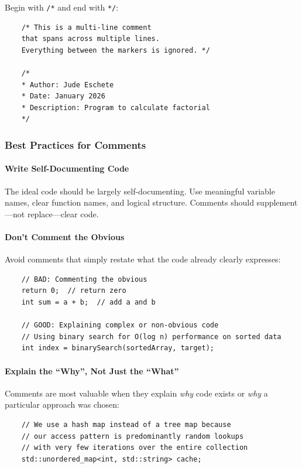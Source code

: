 Begin with \texttt{/*} and end with \texttt{*/}:

\begin{lstlisting}
	/* This is a multi-line comment
	that spans across multiple lines.
	Everything between the markers is ignored. */
	
	/*
	* Author: Jude Eschete
	* Date: January 2026
	* Description: Program to calculate factorial
	*/
\end{lstlisting}

\subsubsection{Best Practices for Comments}

\paragraph{Write Self-Documenting Code}

The ideal code should be largely self-documenting. Use meaningful variable names, clear function names, and logical structure. Comments should supplement—not replace—clear code.

\paragraph{Don't Comment the Obvious}

Avoid comments that simply restate what the code already clearly expresses:

\begin{lstlisting}
	// BAD: Commenting the obvious
	return 0;  // return zero
	int sum = a + b;  // add a and b
	
	// GOOD: Explaining complex or non-obvious code
	// Using binary search for O(log n) performance on sorted data
	int index = binarySearch(sortedArray, target);
\end{lstlisting}

\paragraph{Explain the ``Why'', Not Just the ``What''}

Comments are most valuable when they explain \textit{why} code exists or \textit{why} a particular approach was chosen:

\begin{lstlisting}
	// We use a hash map instead of a tree map because
	// our access pattern is predominantly random lookups
	// with very few iterations over the entire collection
	std::unordered_map<int, std::string> cache;
\end{lstlisting}

